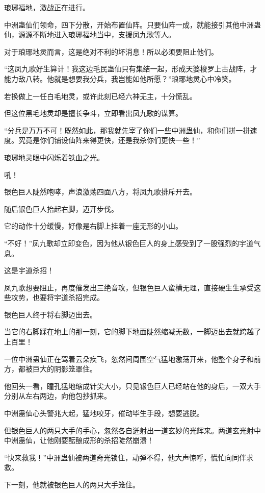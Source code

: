
\begin{this_body}

琅琊福地，激战正在进行。

中洲蛊仙们领命，四下分散，开始布置仙阵。只要仙阵一成，就能接引其他中洲蛊仙，源源不断地进入琅琊福地当中，支援凤九歌等人。

对于琅琊地灵而言，这是绝对不利的坏消息！所以必须要阻止他们。

“这凤九歌好生算计！我这边毛民蛊仙只有集结一起，形成天婆梭罗上古战阵，才能力敌八转。他就是想要我分兵，我岂能如他所愿？”琅琊地灵心中冷笑。

若换做上一任白毛地灵，或许此刻已经六神无主，十分慌乱。

但这位黑毛地灵却是擅长争斗，立即看出凤九歌的谋算。

“分兵是万万不可！既然如此，那我就先宰了你们一些中洲蛊仙，和你们拼一拼速度。究竟是你们铺设仙阵来得更快，还是我杀你们更快一些！”

琅琊地灵眼中闪烁着铁血之光。

吼！

银色巨人陡然咆哮，声浪激荡四面八方，将凤九歌排斥开去。

随后银色巨人抬起右脚，迈开步伐。

它的动作十分缓慢，好像是右脚上挂着一座无形的小山。

“不好！”凤九歌却立即变色，因为他从银色巨人的身上感受到了一股强烈的宇道气息。

这是宇道杀招！

凤九歌想要阻止，再度催发出三绝音攻，但银色巨人蛮横无理，直接硬生生承受这些攻势，也要将宇道杀招完成。

银色巨人终于将右脚迈出去。

当它的右脚踩在地上的那一刻，它的脚下地面陡然缩减无数，一脚迈出去就跨越了上百里！

一位中洲蛊仙正在驾着云朵疾飞，忽然间周围空气猛地激荡开来，他整个身子和前方，都被巨大的阴影笼罩住。

他回头一看，瞳孔猛地缩成针尖大小，只见银色巨人已经站在他的身后，一双大手分别从左右两边，向他包抄抓来。

中洲蛊仙心头警兆大起，猛地咬牙，催动毕生手段，想要逃脱。

但银色巨人的两只大手的手心，忽然各自迸射出一道玄妙的光辉来。两道玄光射中中洲蛊仙，让他刚要酝酿成形的杀招陡然崩溃！

“快来救我！”中洲蛊仙被两道奇光锁住，动弹不得，他大声惊呼，慌忙向同伴求救。

下一刻，他就被银色巨人的两只大手笼住。


\end{this_body}
